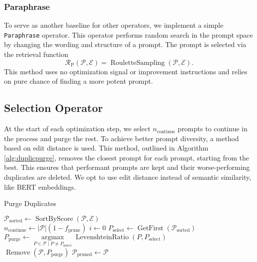 \subsubsection{Paraphrase}
To serve as another baseline for other operators, we implement a simple \texttt{Paraphrase} operator.
This operator performs random search in the prompt space by changing the wording and structure of a prompt.
The prompt is selected via the retrieval function
\begin{equation}
    \mathcal{R}_{\text{P}}(\mathcal{P}, \mathcal{E}) = \operatorname{RouletteSampling}(\mathcal{P}, \mathcal{E}).
\end{equation}
This method uses no optimization signal or improvement instructions and relies on pure chance of finding a more potent prompt.


\subsection{Selection Operator}
At the start of each optimization step, we select $n_{\text{continue}}$ prompts to continue in the process and purge the rest. 
To achieve better prompt diversity, a method based on edit distance is used. This method, outlined in Algorithm \ref{alg:duplicpurge},
removes the closest prompt for each prompt, starting from the best. This ensures that performant prompts are kept and their worse-performing duplicates are deleted.
We opt to use edit distance instead of semantic similarity, like BERT embeddings.

\begin{algorithm}
    \caption{Purge Duplicates}
    \label{alg:duplicpurge}
    $\mathcal{P}_{\text{sorted}} \gets \operatorname{SortByScore}(\mathcal{P}, \mathcal{E})$ \\
    $n_{\text{continue}} \gets \vert\mathcal{P}\vert(1-f_{\text{prune}})$
    $i \gets 0$
     {
        $P_{\text{select}} \gets \operatorname{GetFirst}(\mathcal{P}_{\text{sorted}})$ \\ 
        $P_{\text{purge}} \gets \underset{P\in\mathcal{P}\mid P \neq P_{\text{select}}}{\operatorname{argmax}} \operatorname{LevenshteinRatio}(P, P_{\text{select}})$ \\
        $\operatorname{Remove}(\mathcal{P}, P_{\text{purge}})$
    }
    $\mathcal{P}_{\text{pruned}} \gets \mathcal{P}$\\
\end{algorithm}
